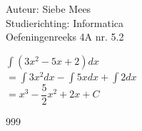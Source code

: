 \documentclass[a4paper]{article}
\begin{document}
  
\noindent \large Auteur: Siebe Mees \\
\noindent \large Studierichting: Informatica\\
\noindent \large Oefeningenreeks 4A nr. 5.2\\

\medskip

\normalsize

$\displaystyle\int (3x^2 - 5x +2) dx$\\

$ = \displaystyle\int 3x^2 dx - \displaystyle\int 5x dx + \displaystyle\int 2 dx $\\ 

$ = x^3 - \dfrac{5}{2}x^2 +2x + C $\\

\begin{thebibliography}{999}
\end{thebibliography}
\end{document}
